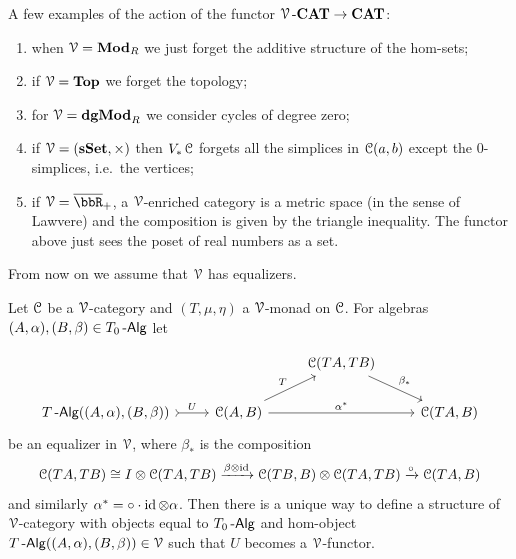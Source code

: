 \documentclass[a4paper,11pt,oneside,openany]{scrbook}
\begin{document}
\begin{exmp}
	A few examples of the action of the functor $\operatorname{\mathcal{V}}\mbox{-}{\normalfont\textbf{CAT}}\to{\normalfont\textbf{CAT}}$:
	\begin{enumerate}
		\item when $\operatorname{\mathcal{V}}={\normalfont\textbf{Mod}}_R$ we just forget the additive structure of the hom-sets;
		\item if $\operatorname{\mathcal{V}}={\normalfont\textbf{Top}}$ we forget the topology;
		\item for $\operatorname{\mathcal{V}}={\normalfont\textbf{dgMod}}_R$ we consider cycles of degree zero;
		\item if $\operatorname{\mathcal{V}}=({\normalfont\textbf{sSet}},\times)$ then $V_*\operatorname{\mathcal{C}}$ forgets all the simplices in
            $\operatorname{\mathcal{C}}(a,b)$ except the $0$-simplices, i.e.\ the vertices;
        \item if $\V=\overline{\bbR}_+$, a $\operatorname{\mathcal{V}}$-enriched category is a metric
            space (in the sense of Lawvere) and the composition is given by the
            triangle inequality. The functor above just sees the poset of real
            numbers as a set.
	\end{enumerate}
\end{exmp}
From now on we assume that $\operatorname{\mathcal{V}}$ has equalizers.
\begin{prop}
	Let $\operatorname{\mathcal{C}}$ be a $\operatorname{\mathcal{V}}$-category and $(T,\mu,\eta)$ a $\operatorname{\mathcal{V}}$-monad on $\operatorname{\mathcal{C}}$. For
    algebras $(A,\alpha), (B,\beta)\in T_0\operatorname{-\mathsf{Alg}}$ let
\end{prop}
\[
	\begin{tikzcd}
		&& \C(TA,TB) \arrow[rd, "\beta_*"] &  \\
		T\Alg((A,\alpha),(B,\beta)) \arrow[r, tail, "U"] & \C(A,B) \arrow[rr, "\alpha^*"] \arrow[ru, "T"] &             & \C(TA,B)
	\end{tikzcd}
\]
be an equalizer in $\operatorname{\mathcal{V}}$, where $\beta_*$ is the composition
$$\operatorname{\mathcal{C}}(TA,TB)\cong I\otimes\operatorname{\mathcal{C}}(TA,TB)\xrightarrow{\beta\otimes\operatorname{id}}\operatorname{\mathcal{C}}(TB,B)\otimes\operatorname{\mathcal{C}}(TA,TB)\xrightarrow{\circ}\operatorname{\mathcal{C}}(TA,B)$$
and similarly $\alpha^*=\circ \cdot \operatorname{id}\otimes\alpha$. Then there is a unique way to define a structure of $\operatorname{\mathcal{V}}$-category with objects equal to $T_0\operatorname{-\mathsf{Alg}}$ and hom-object $T\operatorname{-\mathsf{Alg}}((A,\alpha),(B,\beta))\in\operatorname{\mathcal{V}}$ such that $U$ becomes a $\operatorname{\mathcal{V}}$-functor.
\end{document}
